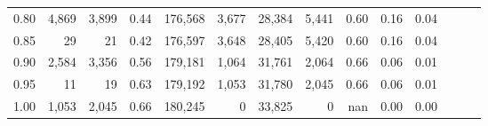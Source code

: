 \begin{tabular}{rrrrrrrrrrrrrr}
0.80 &   4,869 &  3,899 &  0.44 &  176,568 &    3,677 &  28,384 &   5,441 &  0.60 &  0.16 &      0.04 \\
0.85 &      29 &     21 &  0.42 &  176,597 &    3,648 &  28,405 &   5,420 &  0.60 &  0.16 &      0.04 \\
0.90 &   2,584 &  3,356 &  0.56 &  179,181 &    1,064 &  31,761 &   2,064 &  0.66 &  0.06 &      0.01 \\
0.95 &      11 &     19 &  0.63 &  179,192 &    1,053 &  31,780 &   2,045 &  0.66 &  0.06 &      0.01 \\
1.00 &   1,053 &  2,045 &  0.66 &  180,245 &        0 &  33,825 &       0 &   nan &  0.00 &      0.00 \\
\bottomrule
\end{tabular}
